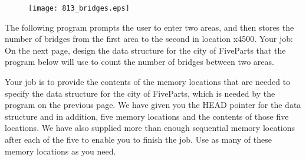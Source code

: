 \documentclass{patt}
\begin{document}
\begin{exercises}
\begin{figure}[h]
\begin{center}
\texttt{[image: 813\_bridges.eps]}
\end{center}
\end{figure}

\noindent
The following program prompts the user to enter two areas, and then stores the
number of bridges from the first area to the second in location x4500.  Your
job: On the next page, design the data structure for the city of FiveParts that
the program below will use to count the number of bridges between two areas. \\

\begin{minipage}[t]{0.5\linewidth}
\end{minipage}

\noindent
Your job is to provide the contents of the memory locations that are needed to
specify the data structure for the city of FiveParts, which is needed by the
program on the previous page.  We have given you the HEAD pointer for the data
structure and in addition, five memory locations and the contents of those five
locations.  We have also supplied more than enough sequential memory locations
after each of the five to enable you to finish the job.  Use as many of these
memory locations as you need.
\vspace{0.2in}


\end{exercises}
\end{document}
